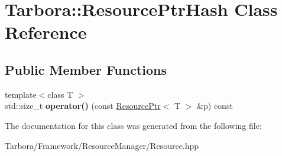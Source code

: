 \hypertarget{classTarbora_1_1ResourcePtrHash}{}\section{Tarbora\+:\+:Resource\+Ptr\+Hash Class Reference}
\label{classTarbora_1_1ResourcePtrHash}
\subsection*{Public Member Functions}
\begin{DoxyCompactItemize}
\item 
\mbox{\label{classTarbora_1_1ResourcePtrHash_a5f1993d36b65699875680a0940602a16}} 
{\footnotesize template$<$class T $>$ }\\std\+::size\+\_\+t {\bfseries operator()} (const \hyperlink{classTarbora_1_1ResourcePtr}{Resource\+Ptr}$<$ T $>$ \&p) const
\end{DoxyCompactItemize}


The documentation for this class was generated from the following file\+:\begin{DoxyCompactItemize}
\item 
Tarbora/\+Framework/\+Resource\+Manager/Resource.\+hpp\end{DoxyCompactItemize}
